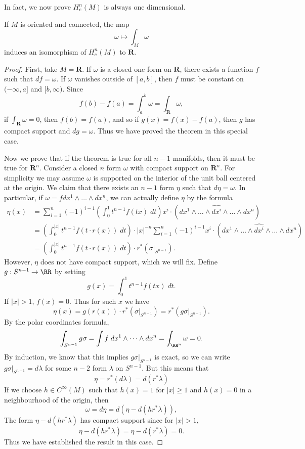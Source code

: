 In fact, we now prove $H^n_c(M)$ is always one dimensional.

\begin{theorem}
    If $M$ is oriented and connected, the map
    \[ \omega \mapsto \int_M \omega \]
    induces an isomorphism of $H^n_c(M)$ to $\mathbf{R}$.
\end{theorem}
\begin{proof}
    First, take $M = \mathbf{R}$. If $\omega$ is a closed one form on $\mathbf{R}$, there exists a function $f$ such that $df = \omega$. If $\omega$ vanishes outside of $[a,b]$, then $f$ must be constant on $(-\infty,a]$ and $[b,\infty)$. Since
    \[ f(b) - f(a) = \int_a^b \omega = \int_{\mathbf{R}} \omega, \]
    if $\int_{\mathbf{R}} \omega = 0$, then $f(b) = f(a)$, and so if $g(x) = f(x) - f(a)$, then $g$ has compact support and $dg = \omega$. Thus we have proved the theorem in this special case.

    Now we prove that if the theorem is true for all $n-1$ manifolds, then it must be true for $\mathbf{R}^n$. Consider a closed $n$ form $\omega$ with compact support on $\mathbf{R}^n$. For simplicity we may assume $\omega$ is supported on the interior of the unit ball centered at the origin. We claim that there exists an $n-1$ form $\eta$ such that $d\eta = \omega$. In particular, if $\omega = f dx^1 \wedge \dots \wedge dx^n$, we can actually define $\eta$ by the formula
    \begin{align*}
        \eta(x) &= \sum_{i = 1}^n (-1)^{i-1} \left( \int_0^1 t^{n-1} f(tx)\; dt \right) x^i \cdot (dx^1 \wedge \dots \wedge \widehat{dx^i} \wedge \dots \wedge dx^n)\\
        &= \left( \int_0^{|x|} t^{n-1} f(t \cdot r(x))\; dt \right) \cdot |x|^{-n} \sum_{i = 1}^n (-1)^{i-1} x^i \cdot (dx^1 \wedge \dots \wedge \widehat{dx^i} \wedge \dots \wedge dx^n)\\
        &= \left( \int_0^{|x|} t^{n-1} f(t \cdot r(x))\; dt \right) \cdot r^*(\sigma|_{S^{n-1}}).
    \end{align*}
    However, $\eta$ does not have compact support, which we will fix. Define $g: S^{n-1} \to \RR$ by setting
    \[ g(x) = \int_0^1 t^{n-1} f(tx)\; dt. \]
    If $|x| > 1$, $f(x) = 0$. Thus for such $x$ we have
    \[ \eta(x) = g(r(x)) \cdot r^*(\sigma|_{S^{n-1}}) = r^*(g \sigma|_{S^{n-1}}). \]
    By the polar coordinates formula,
    \[ \int_{S^{n-1}} g \sigma = \int f\; dx^1 \wedge \dots \wedge dx^n = \int_{\RR^n} \omega = 0. \]
    By induction, we know that this implies $g \sigma|_{S^{n-1}}$ is exact, so we can write $g \sigma|_{S^{n-1}} = d\lambda$ for some $n-2$ form $\lambda$ on $S^{n-1}$. But this means that
    \[ \eta = r^*(d\lambda) = d(r^* \lambda) \]
    If we choose $h \in C^\infty(M)$ such that $h(x) = 1$ for $|x| \geq 1$ and $h(x) = 0$ in a neighbourhood of the origin, then
    \[ \omega = d\eta = d(\eta - d(h r^* \lambda)), \]
    The form $\eta - d(h r^* \lambda)$ has compact support since for $|x| > 1$,
    \[ \eta - d(h r^* \lambda) = \eta - d(r^* \lambda) = 0. \]
    Thus we have established the result in this case.


\end{proof}
